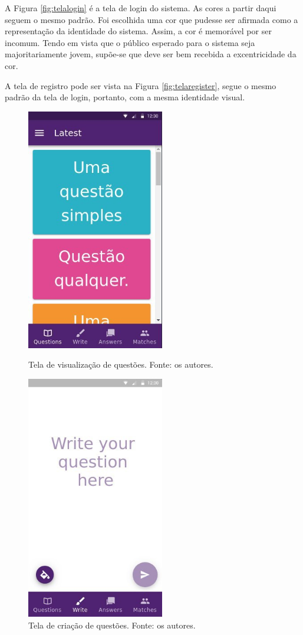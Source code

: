 A Figura \ref{fig:telalogin} é a tela de login do sistema. As cores a partir daqui seguem o mesmo padrão. Foi escolhida uma cor que pudesse ser afirmada como a representação da identidade do sistema. Assim, a cor é memorável por ser incomum. Tendo em vista que o público esperado para o sistema seja majoritariamente jovem, supõe-se que deve ser bem recebida a excentricidade da cor.

A tela de registro pode ser vista na Figura \ref{fig:telaregister}, segue o mesmo padrão da tela de login, portanto, com a mesma identidade visual.

\begin{figure}
\begin{minipage}{0.45\textwidth}
\centering
\includegraphics[width=6cm]{telaQuestoes.png}
\caption{Tela de visualização de questões. Fonte: os autores.}
\label{fig:telaQuestoes}
\end{minipage}\hfill
\begin{minipage}{0.45\textwidth}
\centering
\includegraphics[width=6cm]{telaCriarQuest.png}
\caption{Tela de criação de questões. Fonte: os autores.}
\label{fig:telaCriarQuest}
\end{minipage}\hfill
\end{figure}

